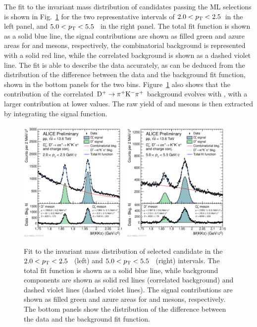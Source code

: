 The fit to the invariant mass distribution of candidates passing the ML selections is shown in Fig.~\ref{fig:new_fit} for the two representative \pt intervals of $2.0<p_\mathrm{T}<2.5$~\gevc in the left panel, and  {$5.0<p_\mathrm{T}<5.5$~\gevc} in the right panel. The total fit function is shown as a solid blue line, the signal contributions are shown as filled green and azure areas for \dpl and \ds mesons, respectively, the combinatorial background is represented with a solid red line, while the correlated background is shown as a dashed violet line. The fit is able to describe the data accurately, as can be deduced from the distribution of the difference between the data and the background fit function, shown in the bottom panels for the two \pt bins. Figure~\ref{fig:new_fit} also shows that the contribution of the correlated $\mathrm{D^+}\rightarrow\mathrm{\pi^+K^-\pi^+}$ background evolves with \pt, with a larger contribution at lower \pt values. The raw yield of \ds and \dpl mesons is then extracted by integrating the signal function.

\begin{figure}[htb]
    \centering
    \includegraphics[width=0.48\textwidth]{Figures/Chapter 5/invmassfit_2_2p5.pdf}
    \includegraphics[width=0.48\textwidth]{Figures/Chapter 5/invmassfit_5_5p5.pdf}
    \caption{Fit to the invariant mass distribution of selected candidate in the \mbox{$2.0<p_\mathrm{T}<2.5$~\gevc} (left) and \mbox{$5.0<p_\mathrm{T}<5.5$~\gevc} (right) intervals. The total fit function is shown as a solid blue line, while background components are shown as solid red lines (correlated background) and dashed violet lines (dashed violet lines). The signal contributions are shown as filled green and azure areas for \dpl and \ds mesons, respectively. The bottom panels show the distribution of the difference between the data and the background fit function.}
    \label{fig:new_fit}
\end{figure}

